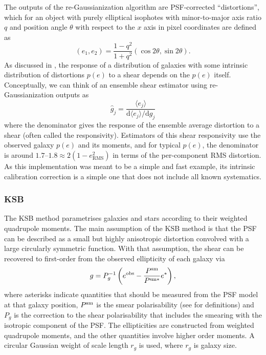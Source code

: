 \documentclass[iop]{emulateapj}
\begin{document}
The outputs of the re-Gaussianization algorithm are PSF-corrected
``distortions'', which for an object with purely elliptical isophotes
with minor-to-major axis ratio $q$ and position angle $\theta$ with
respect to the $x$ axis in pixel coordinates are defined as
\begin{equation}
(e_1, e_2) = \frac{1-q^2}{1+q^2}\left(\cos{2\theta},\sin{2\theta}\right).
\end{equation}
As discussed in \cite{2002AJ....123..583B}, the response of a
distribution of galaxies with some intrinsic distribution of
distortions $p(e)$ to a shear %
depends on
the $p(e)$ itself.  Conceptually, we can think of an ensemble shear
estimator using re-Gaussianization outputs as
\begin{equation}
\hat{g}_j = \frac{\langle e_j\rangle}{\mathrm{d}\langle e_j\rangle/\mathrm{d}g_j}
\end{equation}
where the denominator gives the response of the ensemble average
distortion to a shear (often called the responsivity).  Estimators of
this shear responsivity use the observed galaxy $p(e)$ and its
moments, and for typical $p(e)$, the denominator is around
$1.7$--$1.8\approx 2 (1-e_\text{RMS}^2)$ in terms of the per-component
RMS distortion. As this implementation was meant to be a simple and
fast example, its intrinsic calibration correction is a simple one
that does not include all known systematics.


\subsubsection{KSB}

The KSB method \citep{1995ApJ...449..460K} parametrises galaxies and
stars according to their weighted quadrupole moments.  The main
assumption of the KSB method is that the PSF can be described as a
small but highly anisotropic distortion convolved with a large
circularly symmetric function.  With that assumption, the shear can be
recovered to first-order from the observed ellipticity of each galaxy
via
\begin{equation} \label{eqn:weight}
g=P_{g}^{-1}\left(e^{\rm obs}-\frac{P^{\rm sm}}{P^{\rm sm*}}e^{*}\right),
\end{equation}
where asterisks indicate quantities that should be measured from the
PSF model at that galaxy position, $P^{\rm sm}$ is the smear
polarisability (see \citealt{2006MNRAS.368.1323H} for definitions) and
$P_g$ is the correction to the shear polarisability that includes
the smearing with the isotropic component of the PSF. The
ellipticities are constructed from weighted quadrupole moments, and
the other quantities involve higher order moments. A circular Gaussian
weight of scale length $r_g$ is used, where $r_g$ is galaxy size.
\end{document}
